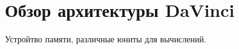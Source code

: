\section{Обзор архитектуры DaVinci}
\label{sec:Chapter6} 

Устройтво памяти, различные юниты для вычислений. 

\newpage

